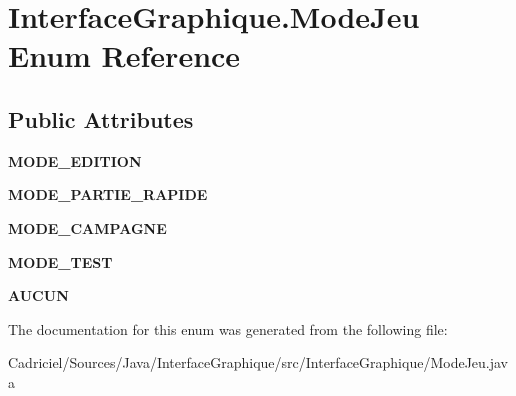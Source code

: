 \hypertarget{enum_interface_graphique_1_1_mode_jeu}{\section{Interface\-Graphique.\-Mode\-Jeu Enum Reference}
\label{enum_interface_graphique_1_1_mode_jeu}
}
\subsection*{Public Attributes}
\begin{DoxyCompactItemize}
\item 
\hypertarget{enum_interface_graphique_1_1_mode_jeu_a2ce3fc855d657e5ed1cb9a1ba39322d1}{{\bfseries M\-O\-D\-E\-\_\-\-E\-D\-I\-T\-I\-O\-N}}\label{enum_interface_graphique_1_1_mode_jeu_a2ce3fc855d657e5ed1cb9a1ba39322d1}

\item 
\hypertarget{enum_interface_graphique_1_1_mode_jeu_aa18a0fa455af8be0edef086145d26a43}{{\bfseries M\-O\-D\-E\-\_\-\-P\-A\-R\-T\-I\-E\-\_\-\-R\-A\-P\-I\-D\-E}}\label{enum_interface_graphique_1_1_mode_jeu_aa18a0fa455af8be0edef086145d26a43}

\item 
\hypertarget{enum_interface_graphique_1_1_mode_jeu_af6363b742c940c0eee0d7a07f92ff6c2}{{\bfseries M\-O\-D\-E\-\_\-\-C\-A\-M\-P\-A\-G\-N\-E}}\label{enum_interface_graphique_1_1_mode_jeu_af6363b742c940c0eee0d7a07f92ff6c2}

\item 
\hypertarget{enum_interface_graphique_1_1_mode_jeu_a9d195d987725b39d401c0af0e650b7f1}{{\bfseries M\-O\-D\-E\-\_\-\-T\-E\-S\-T}}\label{enum_interface_graphique_1_1_mode_jeu_a9d195d987725b39d401c0af0e650b7f1}

\item 
\hypertarget{enum_interface_graphique_1_1_mode_jeu_a58aa4831d87829eb51c57d16dfb2c451}{{\bfseries A\-U\-C\-U\-N}}\label{enum_interface_graphique_1_1_mode_jeu_a58aa4831d87829eb51c57d16dfb2c451}

\end{DoxyCompactItemize}


The documentation for this enum was generated from the following file\-:\begin{DoxyCompactItemize}
\item 
Cadriciel/\-Sources/\-Java/\-Interface\-Graphique/src/\-Interface\-Graphique/Mode\-Jeu.\-java\end{DoxyCompactItemize}
